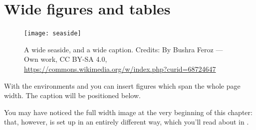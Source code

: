 \section{Wide figures and tables}

\begin{figure}[h!]
	\texttt{[image: seaside]}
	\caption[A wide seaside]{A wide seaside, and a wide caption.
		Credits: By Bushra Feroz --- Own work, CC BY-SA 4.0, 
		\url{https://commons.wikimedia.org/w/index.php?curid=68724647}}
\end{figure}

With the environments  and  you 
can insert figures which span the whole page width. The caption will be 
positioned below.

You may have noticed the full width image at the very beginning of this 
chapter: that, however, is set up in an entirely different way, which 
you'll read about in .
